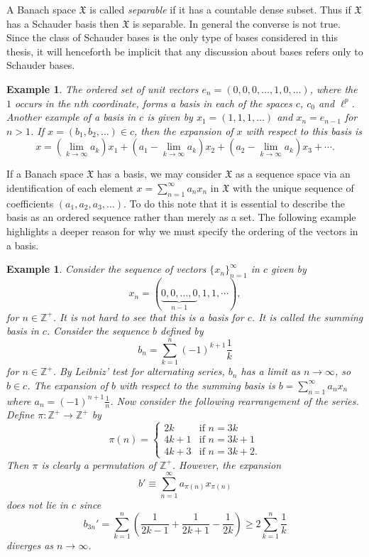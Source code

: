 \documentclass[honours,12pt]{unswthesis}
\newcommand{\Z}{\mathbb{Z}}
\newcommand{\X}{\mathfrak{X}}
\def\lp{\ell^p}
\newtheorem{example}[theorem]{Example}
\numberwithin{equation}{section}
\begin{document}
A Banach space $\X$ is called {\em separable} if it has a countable dense 
subset.
Thus if $\X$ has a Schauder basis then $\X$ is separable. In general the 
converse
is not true. Since the class of Schauder bases is the only type of bases
considered in this
thesis, it will henceforth be implicit that any discussion about bases refers
only to Schauder bases.


\begin{example}
The ordered set of unit vectors $e_n=(0,0,0,\ldots,1,0,\ldots)$, where the $1$
occurs in the $n$th coordinate, forms a basis in each of the spaces
$c$, $c_0$ and $\lp$. Another example of a basis in $c$ is given by
$x_1=(1,1,1,\ldots)$
and $x_n=e_{n-1}$ for $n>1$. If $x=(b_1,b_2,\ldots)\in c$, then the expansion of
$x$ with respect to this basis is
\[x=(\lim_{k\rightarrow\infty}a_k)x_1+(a_1-\lim_{k\rightarrow\infty}a_k)x_2+
(a_2-\lim_{k\rightarrow\infty}a_k)x_3+\cdots.\] 
\end{example}


If a Banach space $\X$ has a basis, we may consider $\X$ as a sequence
space via an identification of each element $x=\sum_{n=1}^{\infty}a_nx_n$ in
$\X$ with the unique sequence of coefficients $(a_1,a_2,a_3,\ldots)$. To do this
note that it is essential to describe the basis as an ordered sequence rather
than merely as a set. The following example highlights a deeper reason for
why we must specify the ordering of the vectors in a basis.

\begin{example}\label{summing basis}
Consider the sequence of vectors $\{x_n\}_{n=1}^{\infty}$ in $c$ given by
\[x_n=(\underbrace{0,0,\ldots,0}_{n-1},1,1,\cdots),\]
for $n\in\Z^+$. It is not hard to see that this is a basis for $c$.
It is called the {\em summing basis} in $c$.
Consider the sequence $b$ defined by
\[b_n=\sum_{k=1}^n(-1)^{k+1}\frac{1}{k}\]
for $n\in\Z^+$. By Leibniz' test for alternating series,
$b_n$ has a limit as $n\rightarrow\infty$, so $b\in c$. The expansion of $b$ 
with
respect to the summing basis is $b=\sum_{n=1}^{\infty}a_nx_n$ where
$a_n=(-1)^{n+1}\frac{1}{n}$. Now consider the following rearrangement of the
series. Define $\pi:\Z^+\rightarrow\Z^+$ by
\[\pi(n)=\left\{\begin{array}{ll}
				2k & \mbox{if $n=3k$}\\
				4k+1 & \mbox{if $n=3k+1$}\\
				4k+3 & \mbox{if $n=3k+2$.}
			\end{array}\right.
\]
Then $\pi$ is clearly a permutation of $\Z^+$. However, the expansion
\[b'\equiv\sum_{n=1}^{\infty}a_{\pi(n)}x_{\pi(n)}\]
does not lie in $c$ since
\[b_{3n}'=\sum_{k=1}^n\left(\frac{1}{2k-1}+\frac{1}{2k+1}-\frac{1}{2k}\right)
\geq 2\sum_{k=1}^n\frac{1}{k}\]
diverges as $n\rightarrow\infty$.
\end{example}
\end{document}
